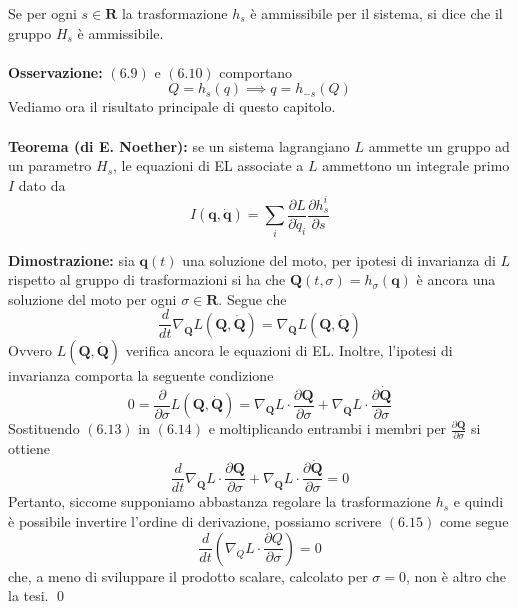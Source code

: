 \documentclass{article}
\begin{document}
Se per ogni $s \in \mathbf{R}$ la trasformazione $h_s$ è ammissibile per il sistema, si dice che il gruppo $H_s$ è ammissibile. \\ \\
\textbf{Osservazione:} $(6.9)$ e $(6.10)$ comportano
\begin{equation}
    Q = h_s(q) \implies q = h_{-s}(Q) \tag{6.11}
\end{equation}
Vediamo ora il risultato principale di questo capitolo. \\ \\
\textbf{Teorema (di E. Noether):} se un sistema lagrangiano $L$ ammette un gruppo ad un parametro $H_s$, le equazioni di EL associate a $L$ ammettono un integrale primo $I$ dato da
\begin{equation}
    I(\mathbf{q}, \dot{\mathbf{q}}) = \sum_i \frac{\partial L}{\partial \dot{q}_i}\frac{\partial h_s^i}{\partial s} \tag{6.12}
\end{equation}

\textbf{Dimostrazione:} sia $\mathbf{q}(t)$ una soluzione del moto, per ipotesi di invarianza di $L$ rispetto al gruppo di trasformazioni si ha che $\mathbf{Q}(t, \sigma) = h_\sigma(\mathbf{q})$ è ancora una soluzione del moto per ogni $\sigma \in \mathbf{R}$. Segue che
\begin{equation}
    \frac{d}{dt}\nabla_{\dot{\mathbf{Q}}} L(\mathbf{Q}, \dot{\mathbf{Q}}) = \nabla_\mathbf{Q} L(\mathbf{Q}, \dot{\mathbf{Q}}) \tag{6.13}
\end{equation}
Ovvero $L(\mathbf{Q}, \dot{\mathbf{Q}})$ verifica ancora le equazioni di EL. Inoltre, l'ipotesi di invarianza comporta la seguente condizione
\begin{equation}
    0 = \frac{\partial}{\partial \sigma}L(\mathbf{Q}, \dot{\mathbf{Q}}) = \nabla_\mathbf{Q} L \cdot \frac{\partial \mathbf{Q}}{\partial \sigma} + \nabla_{\dot{\mathbf{Q}}} L \cdot \frac{\partial \dot{\mathbf{Q}}}{\partial \sigma} \tag{6.14}
\end{equation}
Sostituendo $(6.13)$ in $(6.14)$ e moltiplicando entrambi i membri per $\frac{\partial\mathbf{Q}}{\partial\sigma}$ si ottiene
\begin{equation}
    \frac{d}{dt}\nabla_{\dot{\mathbf{Q}}} L \cdot \frac{\partial \mathbf{Q}}{\partial \sigma} + \nabla_{\dot{\mathbf{Q}}}L \cdot \frac{\partial \dot{\mathbf{Q}}}{\partial \sigma} = 0 \tag{6.15}
\end{equation}
Pertanto, siccome supponiamo abbastanza regolare la trasformazione $h_s$ e quindi è possibile invertire l'ordine di derivazione, possiamo scrivere $(6.15)$ come segue
\begin{equation}
    \frac{d}{dt}\left( \nabla_{\dot{Q}}L \cdot \frac{\partial Q}{\partial \sigma} \right) = 0 \tag{6.16}
\end{equation}
che, a meno di sviluppare il prodotto scalare, calcolato per $\sigma = 0$, non è altro che la tesi. \qed
\end{document}
